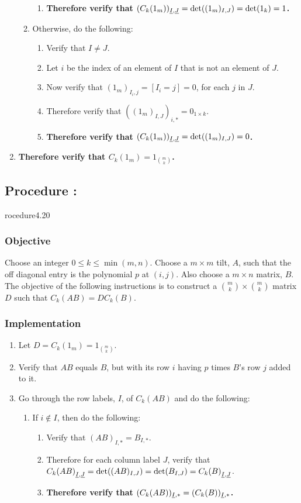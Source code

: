 \documentclass{article}
\newcommand{\ul}[1]{\protect\underline{#1}}
\newcounter{procedure}[part]
\newcommand{\procedure}[1]{\subsection*{Procedure \thepart:\theprocedure}\label{sec:procedure #1}\global\expandafter\edef\csname procedure#1\endcsname{\thepart:\theprocedure}\addtocounter{procedure}{1}}
\newcommand{\objective}{\subsubsection*{Objective}}
\newcommand{\implementation}{\subsubsection*{Implementation}}
\begin{document}
\begin{multicols}{2}
\begin{enumerate}
\begin{enumerate}
\begin{enumerate}
							\item \textbf{Therefore verify that $(C_k(1_m))_{\ul{I},\ul{J}}=\det((1_m)_{I,J})=\det(1_k)=1$.}
						\end{enumerate}
						\item Otherwise, do the following:
						\begin{enumerate}
							\item Verify that $I\ne J$.
							\item Let $i$ be the index of an element of $I$ that is not an element of $J$.
							\item Now verify that $(1_m)_{I_i,j}=[I_i=j]=0$, for each $j$ in $J$.
							\item Therefore verify that $((1_m)_{I,J})_{i,*}=0_{1\times k}$.
							\item \textbf{Therefore verify that $(C_k(1_m))_{\ul{I},\ul{J}}=\det((1_m)_{I,J})=0$.}
						\end{enumerate}
					\end{enumerate}
					\item \textbf{Therefore verify that $C_k(1_m)=1_{\binom{m}{k}}$.}	
				\end{enumerate}
		\procedure{4.20}
			\objective
				Choose an integer $0\le k\le\min(m,n)$. Choose a $m\times m$ tilt, $A$, such that the off diagonal entry is the polynomial $p$ at $(i,j)$. Also choose a $m\times n$ matrix, $B$. The objective of the following instructions is to construct a $\binom{m}{k}\times\binom{m}{k}$ matrix $D$ such that $C_k(AB)=DC_k(B)$.
			\implementation
				\begin{enumerate}
					\item Let $D=C_k(1_m)=1_{\binom{m}{k}}$.
					\item Verify that $AB$ equals $B$, but with its row $i$ having $p$ times $B$'s row $j$ added to it.
					\item Go through the row labels, $I$, of $C_k(AB)$ and do the following:
					\begin{enumerate}
						\item If $i\notin I$, then do the following:
						\begin{enumerate}
							\item Verify that $(AB)_{I,*}=B_{I,*}$.
							\item Therefore for each column label $J$, verify that ${C_k(AB)}_{\ul{I},\ul{J}}=\det((AB)_{I,J})=\det(B_{I,J})={C_k(B)}_{\ul{I},\ul{J}}$.
							\item \textbf{Therefore verify that $(C_k(AB))_{\ul{I},*}=(C_k(B))_{\ul{I},*}$.}

\end{enumerate}
\end{enumerate}
\end{enumerate}
\end{multicols}
\end{document}
